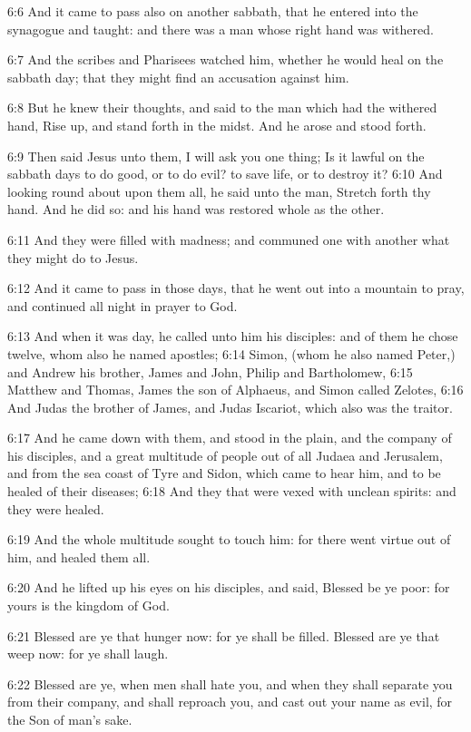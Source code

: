 6:6 And it came to pass also on another sabbath, that he entered into
the synagogue and taught: and there was a man whose right hand was
withered.

6:7 And the scribes and Pharisees watched him, whether he would heal
on the sabbath day; that they might find an accusation against him.

6:8 But he knew their thoughts, and said to the man which had the
withered hand, Rise up, and stand forth in the midst. And he arose and
stood forth.

6:9 Then said Jesus unto them, I will ask you one thing; Is it lawful
on the sabbath days to do good, or to do evil? to save life, or to
destroy it?  6:10 And looking round about upon them all, he said unto
the man, Stretch forth thy hand. And he did so: and his hand was
restored whole as the other.

6:11 And they were filled with madness; and communed one with another
what they might do to Jesus.

6:12 And it came to pass in those days, that he went out into a
mountain to pray, and continued all night in prayer to God.

6:13 And when it was day, he called unto him his disciples: and of
them he chose twelve, whom also he named apostles; 6:14 Simon, (whom
he also named Peter,) and Andrew his brother, James and John, Philip
and Bartholomew, 6:15 Matthew and Thomas, James the son of Alphaeus,
and Simon called Zelotes, 6:16 And Judas the brother of James, and
Judas Iscariot, which also was the traitor.

6:17 And he came down with them, and stood in the plain, and the
company of his disciples, and a great multitude of people out of all
Judaea and Jerusalem, and from the sea coast of Tyre and Sidon, which
came to hear him, and to be healed of their diseases; 6:18 And they
that were vexed with unclean spirits: and they were healed.

6:19 And the whole multitude sought to touch him: for there went
virtue out of him, and healed them all.

6:20 And he lifted up his eyes on his disciples, and said, Blessed be
ye poor: for yours is the kingdom of God.

6:21 Blessed are ye that hunger now: for ye shall be filled. Blessed
are ye that weep now: for ye shall laugh.

6:22 Blessed are ye, when men shall hate you, and when they shall
separate you from their company, and shall reproach you, and cast out
your name as evil, for the Son of man's sake.


